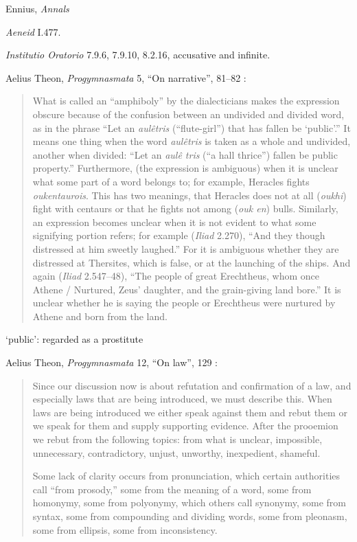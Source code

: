 \documentclass{article}
\begin{document}
Ennius, {\em Annals}

{\em Aeneid} I.477.

{\em Institutio Oratorio} 7.9.6, 7.9.10, 8.2.16, accusative and infinite.












Aelius Theon, {\em Progymnasmata} 5, ``On narrative'', 81--82 \cite[p.~31]{progymnasmata}:

\begin{quote}
What is called an ``amphiboly'' by the dialecticians makes the expression obscure because of the confusion between an undivided and divided word, as in the
phrase ``Let an {\em aul\^{e}tris} (``flute-girl'')
that has fallen be `public'.'' It means one thing when the word {\em aul\^{e}tris} is taken as a whole and undivided, another when
divided: ``Let an {\em aul\^{e} tris} (``a hall thrice'') fallen be public property.''
Furthermore, (the expression is ambiguous) when it is unclear what some part of a word belongs to; for example, Heracles fights {\em oukentaurois}. This has two meanings, that
Heracles does not at all ({\em oukhi}) fight with centaurs or that he fights not among ({\em ouk en}) bulls. Similarly, an expression becomes unclear when it is not evident to what some signifying portion refers; for example ({\em Iliad} 2.270),
``And they though distressed at him sweetly laughed.'' For it is ambiguous whether they are distressed at Thersites, which is false, or at the launching of the ships. And again
({\em Iliad} 2.547--48), ``The people of great Erechtheus, whom once Athene / Nurtured, Zeus' daughter, and the grain-giving land bore.'' It is unclear whether he is saying the people or Erechtheus were nurtured by Athene and born from the land.
\end{quote}

`public': regarded as a prostitute

Aelius Theon, {\em Progymnasmata} 12, ``On law'', 129 \cite[p.~62]{progymnasmata}:

\begin{quote}
Since our discussion now is about refutation and confirmation of a law, and especially laws that are being introduced, we must describe this. When laws are being introduced we either speak against them and rebut them or we speak for them and supply supporting evidence. 
After the prooemion we rebut from the following topics: from what is unclear, impossible, unnecessary, contradictory, unjust, unworthy, inexpedient, shameful.

Some lack of clarity occurs from pronunciation, which certain authorities call ``from prosody,'' some from the meaning of a word, some from homonymy, some from polyonymy,
which others call synonymy, some from syntax, some from compounding and dividing words, some from pleonasm, some from ellipsis, some from inconsistency.
\end{quote}
\end{document}

